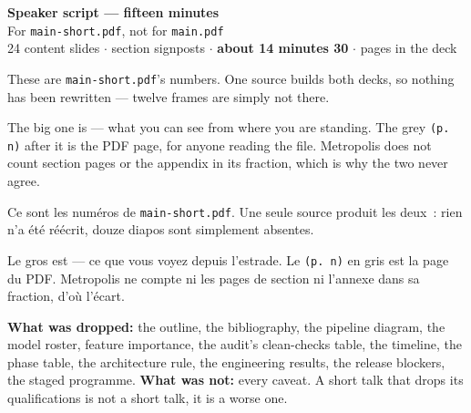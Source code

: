 \documentclass[10pt,a4paper]{article}
\begin{document}

\begin{center}
  {\LARGE\bfseries\color{accent} Speaker script --- fifteen minutes}\\[1.5mm]
  {\large For \texttt{main-short.pdf}, not for \texttt{main.pdf}}\\[3mm]
  {\color{muted}24 content slides \; $\cdot$  section signposts \; $\cdot$ \;
   \textbf{about 14 minutes 30} \; $\cdot$  pages in the deck}
\end{center}

\vspace{4mm}
\noindent
\colorbox{wash}{\parbox{\dimexpr\textwidth-2\fboxsep}{\vspace{1.5mm}
 These are \texttt{main-short.pdf}'s
numbers. One source builds both decks, so nothing has been rewritten --- twelve
frames are simply not there.

\medskip
{} The big one is  --- what you can see from where you are standing. The grey
\texttt{(p.\,n)} after it is the PDF page, for anyone reading the file. Metropolis
does not count section pages or the appendix in its fraction, which is why the two
never agree.

\medskip
{}
 Ce sont les numéros de
\texttt{main-short.pdf}. Une seule source produit les deux~: rien n'a été
réécrit, douze diapos sont simplement absentes.

\medskip
{} Le gros est  --- ce que vous voyez depuis l'estrade. Le \texttt{(p.\,n)} en gris
est la page du PDF. Metropolis ne compte ni les pages de section ni l'annexe dans
sa fraction, d'où l'écart.
\vspace{1.5mm}}}

\vspace{3mm}
\noindent
{\footnotesize\color{muted}\textbf{What was dropped:} the outline, the
bibliography, the pipeline diagram, the model roster, feature importance, the
audit's clean-checks table, the timeline, the phase table, the architecture rule,
the engineering results, the release blockers, the staged programme.
\textbf{What was not:} every caveat. A short talk that drops its qualifications is
not a short talk, it is a worse one.}

\clearpage
\end{document}
